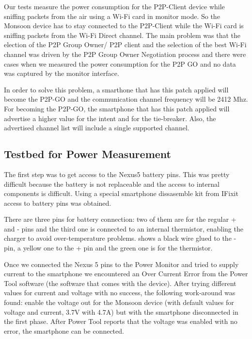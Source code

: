 Our tests measure the power consumption for the P2P-Client device while sniffing packets from the air using a Wi-Fi card in monitor mode. So the Monsoon device has to stay connected to the P2P-Client while the Wi-Fi card is sniffing packets from the Wi-Fi Direct channel. The main problem was that the election of the P2P Group Owner/ P2P client and the selection of the best Wi-Fi channel was driven by the P2P Group Owner Negotiation process and there were cases when we measured the power consumption for the P2P GO and no data was captured by the monitor interface.

In order to solve this problem, a smarthone that has this patch \cite{cite-p2ppatch} applied will become the P2P-GO and the communication channel frequency will be 2412 Mhz. For becoming the P2P-GO, the smartphone that has this patch applied will advertise a higher value for the intent and for the tie-breaker. Also, the advertised channel list will include a single supported channel.

\subsection{Testbed for Power Measurement}
\label{sub-sec:proj-scopepowertopology}

The first step was to get access to the Nexus5 battery pins. This was pretty difficult because the battery is not replaceable and the access to internal components is difficult. Using a special smartphone dissasemble kit from IFixit \cite{cite-ifixit} access to battery pins was obtained.

There are three pins for battery connection: two of them are for the regular + and - pins and the third one is connected to an internal thermistor, enabling the charger to avoid over-temperature problems.  shows a black wire glued to the - pin, a yellow one to the + pin and the green one is for the thermistor.

Once we connected the Nexus 5 pins to the Power Monitor and tried to supply current to the smartphone we encountered an Over Current Error from the Power Tool software (the software that comes with the device). After trying different values for current and voltage with no success, the following work-around was found: enable the voltage out for the Monsoon device (with default values for voltage and current, 3.7V with 4.7A) but with the smartphone disconnected in the first phase. After Power Tool reports that the voltage was enabled with no error, the smartphone can be connected.

